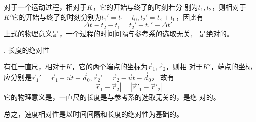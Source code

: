 对于一个运动过程，相对于$K$，它的开始与终了的时刻若分
别为$t_1,t_2$，则相对于$K'$它的开始与终了的时刻分别为$t_1'=t_1+t_0,t_2'=t_2+t_0$，因此有
\begin{equation}\label{eqn:02.05.05}
  \Delta t \equiv t_2 - t_1 = t_2' - t_1' \equiv \Delta t'
\end{equation}
上式的物理意义是，一个过程的时间间隔与参考系的选取无关，
是绝对的。

. 长度的绝对性 \normalfont

有任一直尺，相对于$K$，它的两个端点的坐标为$\vec{r}_1,\vec{r}_2$，则相
对于$K'$，端点的坐标应分别是$\vec{r}_1' = \vec{r}_1 - \vec{u} t - \vec{d}_0,\vec{r}_2' = \vec{r}_2 - \vec{u} t - \vec{d}_0$，
故有
\begin{equation}\label{eqn:02.05.06}
  |\vec{r}_1 - \vec{r}_2| = |\vec{r}'_1 - \vec{r}'_2|
\end{equation}
它的物理意义是，一直尺的长度是与参考系的选取无关的，是绝
对的。

总之，速度相对性是以时间间隔和长度的绝对性为基础的。
